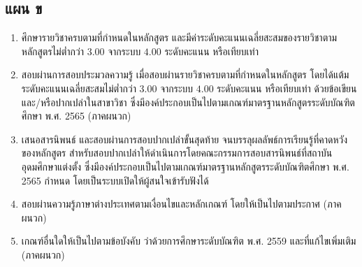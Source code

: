  \subsection{แผน ข }
\begin{enumerate}
   	\item ศึกษารายวิชาครบตามที่กำหนดในหลักสูตร และมีค่าระดับคะแนนเฉลี่ยสะสมของรายวิชาตามหลักสูตรไม่ต่ำกว่า $3.00$ จากระบบ $4.00$ ระดับคะแนน หรือเทียบเท่า
   	\item  สอบผ่านการสอบประมวลความรู้ เมื่อสอบผ่านรายวิชาครบตามที่กำหนดในหลักสูตร โดยได้แต้มระดับคะแนนเฉลี่ยสะสมไม่ต่ำกว่า $3.00$ จากระบบ $4.00$ ระดับคะแนน หรือเทียบเท่า ด้วยข้อเขียนและ/หรือปากเปล่าในสาขาวิชา\thdegreebranch{} ซึ่งมีองค์ประกอบเป็นไปตามเกณฑ์มาตรฐานหลักสูตรระดับบัณฑิตศึกษา พ.ศ. 2565 (ภาคผนวก)
   	\item เสนอสารนิพนธ์ และสอบผ่านการสอบปากเปล่าขั้นสุดท้าย จนบรรลุผลลัพธ์การเรียนรู้ที่คาดหวังของหลักสูตร สำหรับสอบปากเปล่าให้ดำเนินการโดยคณะกรรมการสอบสารนิพนธ์ที่สถาบันอุดมศึกษาแต่งตั้ง ซึ่งมีองค์ประกอบเป็นไปตามเกณฑ์มาตรฐานหลักสูตรระดับบัณฑิตศึกษา พ.ศ. 2565 กำหนด โดยเป็นระบบเปิดให้ผู้สนใจเข้ารับฟังได้
   	\item สอบผ่านความรู้ภาษาต่างประเทศตามเงื่อนไขและหลักเกณฑ์ โดยให้เป็นไปตามประกาศ\university{} (ภาคผนวก)
   	\item เกณฑ์อื่นใดให้เป็นไปตามข้อบังคับ\university{} ว่าด้วยการศึกษาระดับบัณฑิต พ.ศ. 2559 และที่แก้ไขเพิ่มเติม (ภาคผนวก)   	 
   	\end{enumerate}













